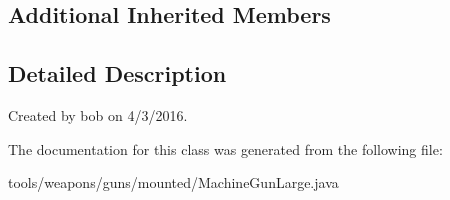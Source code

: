 \subsection*{Additional Inherited Members}


\subsection{Detailed Description}
Created by bob on 4/3/2016. 

The documentation for this class was generated from the following file\+:\begin{DoxyCompactItemize}
\item 
tools/weapons/guns/mounted/Machine\+Gun\+Large.\+java\end{DoxyCompactItemize}
